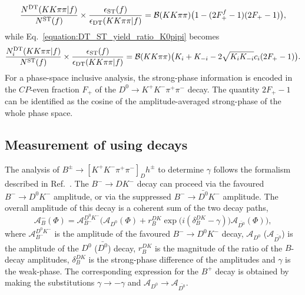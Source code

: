 \documentclass[12pt, a4paper, notitlepage, onecolumn]{article}
\begin{document}
\begin{equation}
    \frac{N^{\rm DT}(KK\pi\pi | f)}{N^{\rm ST}(f)}\times\frac{\epsilon_{\rm ST}(f)}{\epsilon_{\rm DT}(KK\pi\pi | f)} = \mathcal{B}(KK\pi\pi)\big(1 - (2F_+^{f} - 1)(2F_+ - 1)\big),
    \label{equation:DT_ST_yield_ratio_FPlus}
\end{equation}
while Eq.~\eqref{equation:DT_ST_yield_ratio_K0pipi} becomes
\begin{equation}
    \frac{N_i^{\rm DT}(KK\pi\pi | f)}{N^{\rm ST}(f)}\times\frac{\epsilon_{\rm ST}(f)}{\epsilon_{\rm DT}(KK\pi\pi | f)} = \mathcal{B}(KK\pi\pi)\big(K_i + K_{-i} - 2\sqrt{K_iK_{-i}}c_i(2F_+ - 1)\big).
    \label{equation:DT_ST_yield_ratio_K0pipi_FPlus}
\end{equation}
For a phase-space inclusive analysis, the strong-phase information is encoded in the $C\!P$-even fraction $F_+$ of the $D^0\to K^+K^-\pi^+\pi^-$ decay. The quantity $2F_+ - 1$ can be identified as the cosine of the amplitude-averaged strong-phase of the whole phase space.

\subsection{Measurement of \texorpdfstring{\boldmath{$\gamma$}}{gamma} using \texorpdfstring{}{B} decays}
\noindent The analysis of $B^\pm\to[K^+K^-\pi^+\pi^-]_Dh^\pm$ to determine $\gamma$ follows the formalism described in Ref.~\cite{LHCb-PAPER-2020-019}. The $B^-\to DK^-$ decay can proceed via the favoured $B^-\to D^0K^-$ amplitude, or via the suppressed $B^-\to\bar{D^0}K^-$ amplitude. The overall amplitude of this decay is a coherent sum of the two decay paths,
\begin{equation}
    \mathcal{A}_B^-(\Phi) = \mathcal{A}_{B^-}^{D^0K^-}\Big(\mathcal{A}_{D^0}(\Phi) + r_B^{DK}\exp\big(i(\delta_B^{DK} - \gamma)\big)\mathcal{A}_{\bar{D^0}}(\Phi)\Big),
    \label{equation:Bpm_amplitude}
\end{equation}
where $\mathcal{A}_{B^-}^{D^0K^-}$ is the amplitude of the favoured $B^-\to D^0 K^-$ decay, $\mathcal{A}_{D^0}$ ($\mathcal{A}_{\bar{D^0}}$) is the amplitude of the $D^0$ ($\bar{D^0}$) decay, $r_B^{DK}$ is the magnitude of the ratio of the $B$-decay amplitudes, $\delta_B^{DK}$ is the strong-phase difference of the amplitudes and $\gamma$ is the weak-phase. The corresponding expression for the $B^+$ decay is obtained by making the substitutions $\gamma\to -\gamma$ and $\mathcal{A}_{D^0}\to\mathcal{A}_{\bar{D^0}}$.
\end{document}
